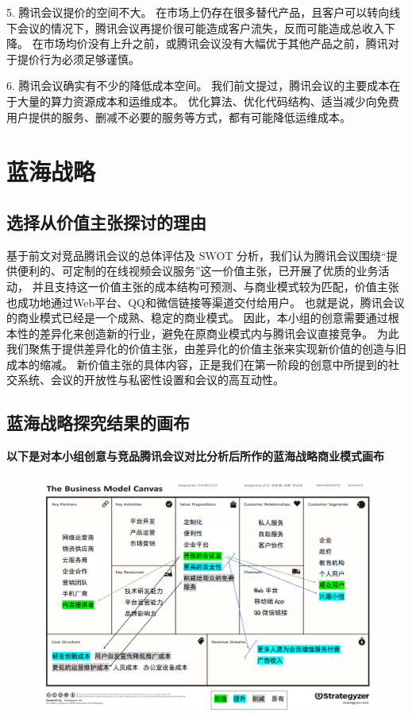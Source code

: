\documentclass[a4paper,12pt]{article}
\begin{document}
    5.
    腾讯会议提价的空间不大。
    在市场上仍存在很多替代产品，且客户可以转向线下会议的情况下，腾讯会议再提价很可能造成客户流失，反而可能造成总收入下降。
    在市场均价没有上升之前，或腾讯会议没有大幅优于其他产品之前，腾讯对于提价行为必须足够谨慎。

    6.
    腾讯会议确实有不少的降低成本空间。
    我们前文提过，腾讯会议的主要成本在于大量的算力资源成本和运维成本。
    优化算法、优化代码结构、适当减少向免费用户提供的服务、删减不必要的服务等方式，都有可能降低运维成本。

    
    \section{蓝海战略}

    
    \subsection{选择从价值主张探讨的理由}
    基于前文对竞品腾讯会议的总体评估及 SWOT 分析，我们认为腾讯会议围绕“提供便利的、可定制的在线视频会议服务”这一价值主张，已开展了优质的业务活动，
    并且支持这一价值主张的成本结构可预测、与商业模式较为匹配，价值主张也成功地通过Web平台、QQ和微信链接等渠道交付给用户。
    也就是说，腾讯会议的商业模式已经是一个成熟、稳定的商业模式。
    因此，本小组的创意需要通过根本性的差异化来创造新的行业，避免在原商业模式内与腾讯会议直接竞争。
    为此我们聚焦于提供差异化的价值主张，由差异化的价值主张来实现新价值的创造与旧成本的缩减。
    新价值主张的具体内容，正是我们在第一阶段的创意中所提到的社交系统、会议的开放性与私密性设置和会议的高互动性。
    
    \subsection{蓝海战略探究结果的画布}
    \textbf{以下是对本小组创意与竞品腾讯会议对比分析后所作的蓝海战略商业模式画布}
    \clearpage
    \begin{figure}[htbp]
        \centering
        \includegraphics[scale=0.4]{png/蓝海战略}
        \caption{}
        \label{fig:buleSea}
    \end{figure}
\end{document}
